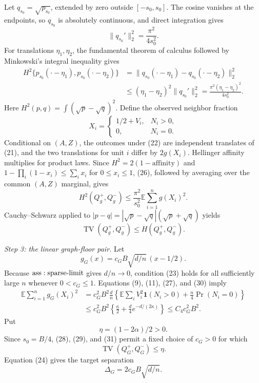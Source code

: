 Let \(q_{s_0}=\sqrt{p_{s_0}}\), extended by zero outside \([-s_0,s_0]\).  The cosine vanishes at the endpoints, so \(q_{s_0}\) is absolutely continuous, and direct integration gives
\[
 \|q_{s_0}'\|_2^2=\frac{\pi^2}{4s_0^2}.
\tag{25}
\]
For translations \(\eta_1,\eta_2\), the fundamental theorem of calculus followed by Minkowski's integral inequality gives
\[
 \begin{aligned}
 H^2\{p_{s_0}(\mathord\cdot-\eta_1),p_{s_0}(\mathord\cdot-\eta_2)\}
 &=\|q_{s_0}(\mathord\cdot-\eta_1)-q_{s_0}(\mathord\cdot-\eta_2)\|_2^2\\
 &\leq(\eta_1-\eta_2)^2\|q_{s_0}'\|_2^2
 =\frac{\pi^2(\eta_1-\eta_2)^2}{4s_0^2}.
 \end{aligned}
\tag{26}
\]
Here \(H^2(p,q)=\int(\sqrt p-\sqrt q)^2\).  Define the observed neighbor fraction
\[
 X_i=\begin{cases}1/2+V_i,&N_i>0,\\0,&N_i=0.\end{cases}
\tag{27}
\]
Conditional on \((A,Z)\), the outcomes under (22) are independent translates of (21), and the two translations for unit \(i\) differ by \(2g(X_i)\).  Hellinger affinity multiplies for product laws.  Since \(H^2=2(1-\text{affinity})\) and \(1-\prod_i(1-x_i)\leq\sum_i x_i\) for \(0\leq x_i\leq1\), (26), followed by averaging over the common \((A,Z)\) marginal, gives
\[
 H^2(Q_g^+,Q_g^-)
 \leq\frac{\pi^2}{s_0^2}\mathbb E\sum_{i=1}^ng(X_i)^2.
\tag{28}
\]
Cauchy--Schwarz applied to \(|p-q|=|\sqrt p-\sqrt q|(\sqrt p+\sqrt q)\) yields
\[
 \operatorname{TV}(Q_g^+,Q_g^-)
 \leq H(Q_g^+,Q_g^-).
\tag{29}
\]

\textit{Step 3: the linear graph-floor pair.}
Let
\[
 g_G(x)=c_GB\sqrt{d/n}\,(x-1/2).
\tag{30}
\]
Because \({\rm ass:sparse\text{-}limit}\) gives \(d/n\to0\), condition (23) holds for all sufficiently large \(n\) whenever \(0<c_G\leq1\).  Equations (9), (11), (27), and (30) imply
\[
 \begin{aligned}
 \mathbb E\sum_{i=1}^ng_G(X_i)^2
 &=c_G^2B^2\frac dn
 \left\{\mathbb E\sum_iV_i^2\mathbf1(N_i>0)
 +\frac n4\Pr(N_i=0)\right\}\\
 &\leq c_G^2B^2
 \left\{\frac\kappa2+\frac d4e^{-d/(2\kappa)}\right\}
 \leq C_4c_G^2B^2.
 \end{aligned}
\tag{31}
\]
Put
\[
 \eta=(1-2\alpha)/2>0.
\tag{32}
\]
Since \(s_0=B/4\), (28), (29), and (31) permit a fixed choice of \(c_G>0\) for which
\[
 \operatorname{TV}(Q_G^+,Q_G^-)\leq\eta.
\tag{33}
\]
Equation (24) gives the target separation
\[
 \Delta_G=2c_GB\sqrt{d/n}.
\tag{34}
\]

